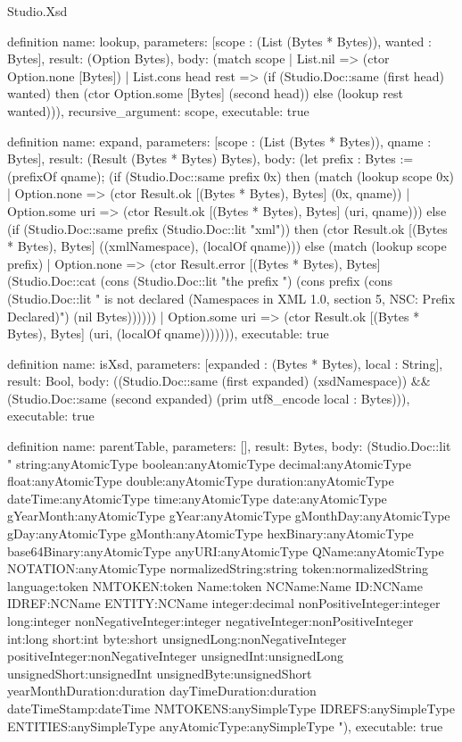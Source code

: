 \begin{lexlean}{Studio.Xsd}
\begin{semanticmodule}
definition{
  name: lookup,
  parameters: [scope : (List (Bytes * Bytes)), wanted : Bytes],
  result: (Option Bytes),
  body: (match scope
    | List.nil => (ctor Option.none [Bytes])
    | List.cons head rest => (if (Studio.Doc::same (first head) wanted) then (ctor Option.some [Bytes] (second head)) else (lookup rest wanted))),
  recursive_argument: scope,
  executable: true
}

definition{
  name: expand,
  parameters: [scope : (List (Bytes * Bytes)), qname : Bytes],
  result: (Result (Bytes * Bytes) Bytes),
  body: (let prefix : Bytes := (prefixOf qname); (if (Studio.Doc::same prefix 0x) then (match (lookup scope 0x)
    | Option.none => (ctor Result.ok [(Bytes * Bytes), Bytes] (0x, qname))
    | Option.some uri => (ctor Result.ok [(Bytes * Bytes), Bytes] (uri, qname))) else (if (Studio.Doc::same prefix (Studio.Doc::lit "xml")) then (ctor Result.ok [(Bytes * Bytes), Bytes] ((xmlNamespace), (localOf qname))) else (match (lookup scope prefix)
    | Option.none => (ctor Result.error [(Bytes * Bytes), Bytes] (Studio.Doc::cat (cons (Studio.Doc::lit "the prefix ") (cons prefix (cons (Studio.Doc::lit " is not declared (Namespaces in XML 1.0, section 5, NSC: Prefix Declared)") (nil Bytes))))))
    | Option.some uri => (ctor Result.ok [(Bytes * Bytes), Bytes] (uri, (localOf qname))))))),
  executable: true
}

definition{
  name: isXsd,
  parameters: [expanded : (Bytes * Bytes), local : String],
  result: Bool,
  body: ((Studio.Doc::same (first expanded) (xsdNamespace)) && (Studio.Doc::same (second expanded) (prim utf8_encode local : Bytes))),
  executable: true
}

definition{
  name: parentTable,
  parameters: [],
  result: Bytes,
  body: (Studio.Doc::lit " string:anyAtomicType boolean:anyAtomicType decimal:anyAtomicType float:anyAtomicType double:anyAtomicType duration:anyAtomicType dateTime:anyAtomicType time:anyAtomicType date:anyAtomicType gYearMonth:anyAtomicType gYear:anyAtomicType gMonthDay:anyAtomicType gDay:anyAtomicType gMonth:anyAtomicType hexBinary:anyAtomicType base64Binary:anyAtomicType anyURI:anyAtomicType QName:anyAtomicType NOTATION:anyAtomicType normalizedString:string token:normalizedString language:token NMTOKEN:token Name:token NCName:Name ID:NCName IDREF:NCName ENTITY:NCName integer:decimal nonPositiveInteger:integer long:integer nonNegativeInteger:integer negativeInteger:nonPositiveInteger int:long short:int byte:short unsignedLong:nonNegativeInteger positiveInteger:nonNegativeInteger unsignedInt:unsignedLong unsignedShort:unsignedInt unsignedByte:unsignedShort yearMonthDuration:duration dayTimeDuration:duration dateTimeStamp:dateTime NMTOKENS:anySimpleType IDREFS:anySimpleType ENTITIES:anySimpleType anyAtomicType:anySimpleType "),
  executable: true
}


\end{semanticmodule}
\end{lexlean}
